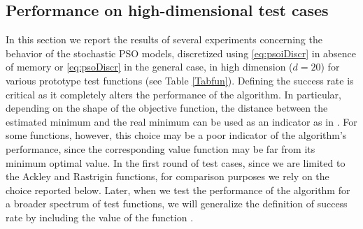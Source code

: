 \documentclass{ims9x6}
\begin{document}
\subsection{Performance on high-dimensional test cases}
In this section we report the results of several experiments concerning the behavior of the stochastic PSO models, discretized using \eqref{eq:psoiDiscr} in absence of memory or \eqref{eq:psoDiscr} in the general case, in high dimension ($d=20$) for various prototype test functions (see Table \ref{Tabfun}). 
Defining the success rate is critical as it completely alters the performance of the algorithm.  In particular, depending on the shape of the objective function, the distance between the estimated minimum and the real minimum can be used as an indicator as in \cite{pinnau2017consensus,carrillo2018analytical,carrillo2019consensus,fhps20-1,fhps20-2}. For some functions, however, this choice may be a poor indicator of the algorithm's performance, since the corresponding value function may be far from its minimum optimal value. In the first round of test cases, since we are limited to the Ackley and Rastrigin functions, for comparison purposes we rely on the choice reported below. Later, when we test the performance of the algorithm for a broader spectrum of test functions, we will generalize the definition of success rate by including the value of the function \cite{TW}.  
\end{document}
